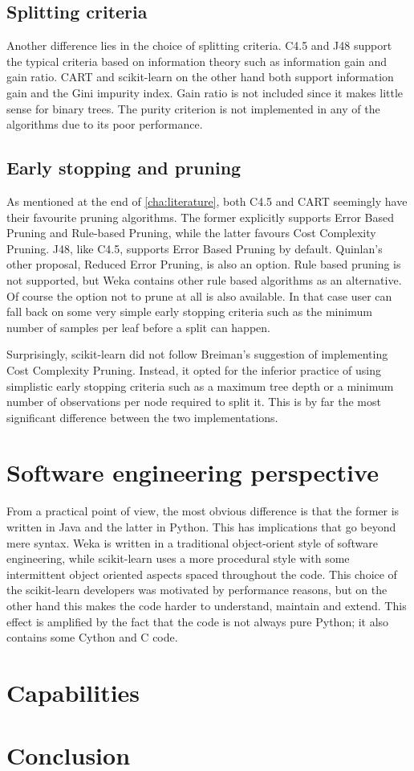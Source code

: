 
\subsection{Splitting criteria}
Another difference lies in the choice of splitting criteria. C4.5 and J48 support the typical criteria based on information theory such as information gain and gain ratio. CART and scikit-learn on the other hand both support information gain and the Gini impurity index. Gain ratio is not included since it makes little sense for binary trees. The purity criterion is not implemented in any of the algorithms due to its poor performance.

\subsection{Early stopping and pruning}
As mentioned at the end of \autoref{cha:literature}, both C4.5 and CART seemingly have their favourite pruning algorithms. The former explicitly supports Error Based Pruning and Rule-based Pruning, while the latter favours Cost Complexity Pruning. J48, like C4.5, supports Error Based Pruning by default. Quinlan's other proposal, Reduced Error Pruning, is also an option. Rule based pruning is not supported, but Weka contains other rule based algorithms as an alternative. Of course the option not to prune at all is also available. In that case user can fall back on some very simple early stopping criteria such as the minimum number of samples per leaf before a split can happen.

Surprisingly, scikit-learn did not follow Breiman's suggestion of implementing Cost Complexity Pruning. Instead, it opted for the inferior practice of using simplistic early stopping criteria such as a maximum tree depth or a minimum number of observations per node required to split it. This is by far the most significant difference between the two implementations.


\section{Software engineering perspective}
From a practical point of view, the most obvious difference is that the former is written in Java and the latter in Python. This has implications that go beyond mere syntax. Weka is written in a traditional object-orient style of software engineering, while scikit-learn uses a more procedural style with some intermittent object oriented aspects spaced throughout the code. This choice of the scikit-learn developers was motivated by performance reasons, but on the other hand this makes the code harder to understand, maintain and extend. This effect is amplified by the fact that the code is not always pure Python; it also contains some Cython and C code.

\section{Capabilities}

\section{Conclusion}
